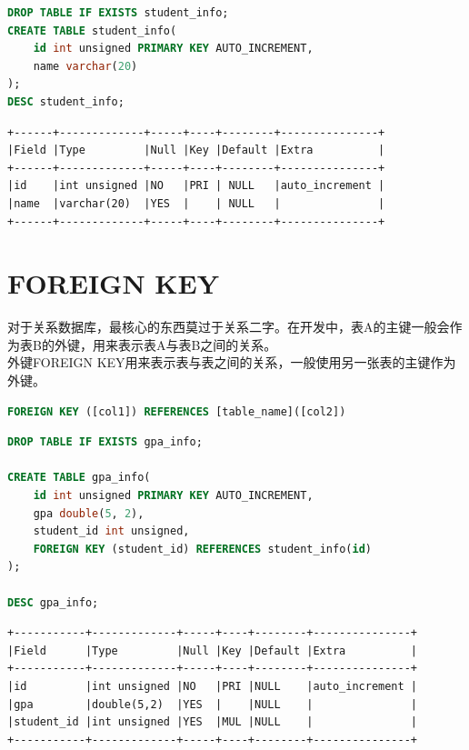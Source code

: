 \documentclass[12pt, openany, oneside]{book}
\begin{document}
\begin{lstlisting}[language=SQL]
DROP TABLE IF EXISTS student_info;
CREATE TABLE student_info(
	id int unsigned PRIMARY KEY AUTO_INCREMENT,
	name varchar(20)
);
DESC student_info;
\end{lstlisting}

\begin{tcolorbox}
    \begin{verbatim}
+------+-------------+-----+----+--------+---------------+
|Field |Type         |Null |Key |Default |Extra          |
+------+-------------+-----+----+--------+---------------+
|id    |int unsigned |NO   |PRI | NULL   |auto_increment |
|name  |varchar(20)  |YES  |    | NULL   |               |
+------+-------------+-----+----+--------+---------------+
	\end{verbatim}
\end{tcolorbox}

\section{FOREIGN KEY}

对于关系数据库，最核心的东西莫过于关系二字。在开发中，表A的主键一般会作为表B的外键，用来表示表A与表B之间的关系。 \\

外键FOREIGN KEY用来表示表与表之间的关系，一般使用另一张表的主键作为外键。

\vspace{-0.5cm}

\begin{lstlisting}[language=SQL]
FOREIGN KEY ([col1]) REFERENCES [table_name]([col2])
\end{lstlisting}

\vspace{0.5cm}


\begin{lstlisting}[language=SQL]
DROP TABLE IF EXISTS gpa_info;

CREATE TABLE gpa_info(
    id int unsigned PRIMARY KEY AUTO_INCREMENT,
    gpa double(5, 2),
    student_id int unsigned,
    FOREIGN KEY (student_id) REFERENCES student_info(id)
);

DESC gpa_info;
\end{lstlisting}

\begin{tcolorbox}
    \begin{verbatim}
+-----------+-------------+-----+----+--------+---------------+
|Field      |Type         |Null |Key |Default |Extra          |
+-----------+-------------+-----+----+--------+---------------+
|id         |int unsigned |NO   |PRI |NULL    |auto_increment |
|gpa        |double(5,2)  |YES  |    |NULL    |               |
|student_id |int unsigned |YES  |MUL |NULL    |               |
+-----------+-------------+-----+----+--------+---------------+
	\end{verbatim}
\end{tcolorbox}
\end{document}
